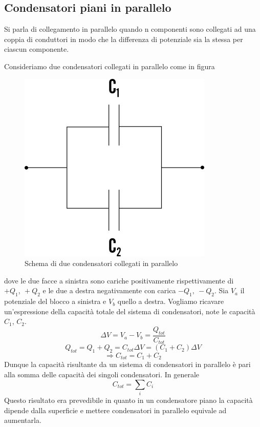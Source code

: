 \documentclass[
10pt, %
a4paper, %
oneside, %
headinclude,footinclude, %
BCOR5mm, %
]{scrartcl}
\begin{document}
\subsection*{Condensatori piani in parallelo}
\begin{definizione}
Si parla di collegamento in parallelo quando n componenti sono collegati ad una coppia di conduttori in modo che la differenza di potenziale sia la stessa per ciascun componente.
\end{definizione}
Consideriamo due condensatori collegati in parallelo come in figura
\begin{figure}[h!]
	\centering
	\includegraphics[width=0.4\linewidth]{../images/Condensatori_parallelo}
	\caption{Schema di due condensatori collegati in parallelo}
	\label{fig:condensatoriparallelo}
\end{figure}
\FloatBarrier
dove le due facce a sinistra sono cariche positivamente rispettivamente di \(+Q_1,\ +Q_2\) e le due a destra negativamente con carica \(-Q_1,\ -Q_2\). Sia \(V_a\) il potenziale del blocco a sinistra e \(V_b\) quello a destra. Vogliamo ricavare un'espressione della capacità totale del sistema di condensatori, note le capacità \(C_1\), \(C_2\). 
\[\Delta V = V_a - V_b = \frac{Q_{tot}}{C_{tot}}\] 
\[Q_{tot}=Q_1+Q_2=C_{tot}\Delta V = (C_1+C_2)\Delta V\]
\[\Rightarrow C_{tot} = C_1 +C_2\]
Dunque la capacità risultante da un sistema di condensatori in parallelo è pari alla somma delle capacità dei singoli condensatori. In generale
\[C_{tot} = \sum_i C_i\]
Questo risultato era prevedibile in quanto in un condensatore piano la capacità dipende dalla superficie e mettere condensatori in parallelo equivale ad aumentarla. 
\end{document}
